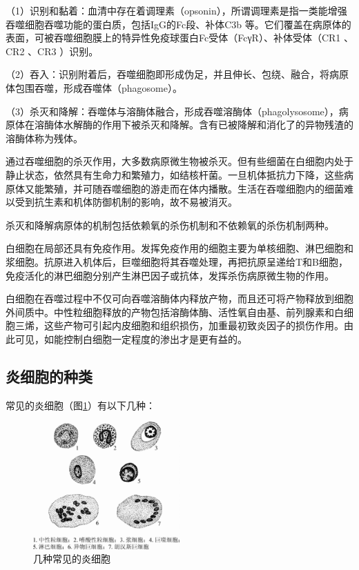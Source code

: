 （1）识别和黏着：血清中存在着调理素（opsonin），所谓调理素是指一类能增强吞噬细胞吞噬功能的蛋白质，包括IgG的Fc段、补体C{3b}
等。它们覆盖在病原体的表面，可被吞噬细胞膜上的特异性免疫球蛋白Fc受体（FcγR）、补体受体（CR{1}
、CR{2} 、CR{3} ）识别。

（2）吞入：识别附着后，吞噬细胞即形成伪足，并且伸长、包绕、融合，将病原体包围吞噬，形成吞噬体（phagosome）。

（3）杀灭和降解：吞噬体与溶酶体融合，形成吞噬溶酶体（phagolysosome），病原体在溶酶体水解酶的作用下被杀灭和降解。含有已被降解和消化了的异物残渣的溶酶体称为残体。

通过吞噬细胞的杀灭作用，大多数病原微生物被杀灭。但有些细菌在白细胞内处于静止状态，依然具有生命力和繁殖力，如结核杆菌。一旦机体抵抗力下降，这些病原体又能繁殖，并可随吞噬细胞的游走而在体内播散。生活在吞噬细胞内的细菌难以受到抗生素和机体防御机制的影响，故不易被消灭。

杀灭和降解病原体的机制包括依赖氧的杀伤机制和不依赖氧的杀伤机制两种。

白细胞在局部还具有免疫作用。发挥免疫作用的细胞主要为单核细胞、淋巴细胞和浆细胞。抗原进入机体后，巨噬细胞将其吞噬处理，再把抗原呈递给T和B细胞，免疫活化的淋巴细胞分别产生淋巴因子或抗体，发挥杀伤病原微生物的作用。

白细胞在吞噬过程中不仅可向吞噬溶酶体内释放产物，而且还可将产物释放到细胞外间质中。中性粒细胞释放的产物包括溶酶体酶、活性氧自由基、前列腺素和白细胞三烯，这些产物可引起内皮细胞和组织损伤，加重最初致炎因子的损伤作用。由此可见，如能控制白细胞一定程度的渗出才是更有益的。

\subsection{炎细胞的种类}

常见的炎细胞（图\ref{fig4-4}）有以下几种：

\begin{figure}[!htbp]
  \centering
  \includegraphics[width=0.5\textwidth]{./images/Image00054.jpg}
  \caption{几种常见的炎细胞}
  \label{fig4-4}
\end{figure}

